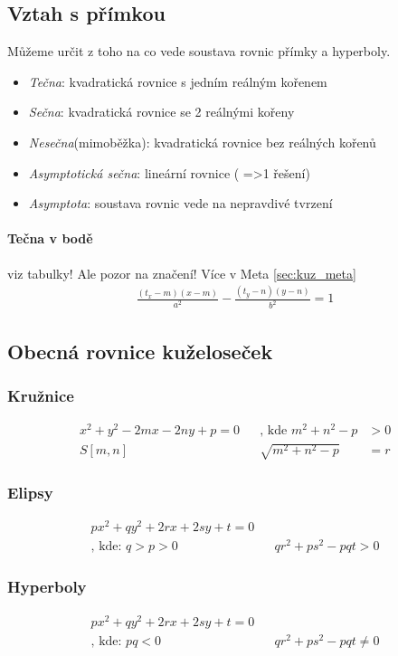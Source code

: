 \documentclass[12pt]{article}
\begin{document}
\subsection{Vztah s přímkou}
Můžeme určit z toho na co vede soustava rovnic přímky a hyperboly.
\begin{itemize}
\item \emph{Tečna}: kvadratická rovnice s jedním reálným kořenem
\item \emph{Sečna}: kvadratická rovnice se 2 reálnými kořeny
\item \emph{Nesečna}(mimoběžka): kvadratická rovnice bez reálných kořenů
\item \emph{Asymptotická sečna}: lineární rovnice ( =>1 řešení)
\item \emph{Asymptota}: soustava rovnic vede na nepravdivé tvrzení
\end{itemize}
\paragraph{Tečna v bodě}
viz tabulky! Ale pozor na značení! Více v Meta \ref{sec:kuz_meta}
\begin{align}
\frac{(t_x-m)(x-m)}{a^2} - \frac{(t_y - n)(y-n)}{b^2} = 1
\end{align}

\subsection{Obecná rovnice kuželoseček}
\subsubsection{Kružnice}
\begin{align}
x^2 + y^2 - 2mx - 2ny + p = 0 && \text{, kde	} m^2 + n^2 - p &>0 \\
S[m,n] && \sqrt{m^2 + n^2 -p} &= r
\end{align}
\subsubsection{Elipsy}
\begin{align}
px^2 + qy^2 +2rx+2sy +t =0  && \\
\text{, kde:	} q > p>0 && qr^2 + ps^2 -pqt >0
\end{align}
\subsubsection{Hyperboly}
\begin{align}
px^2 + qy^2 +2rx+2sy +t =0 \\
\text{, kde:	} pq <0 && qr^2 + ps^2 -pqt  \neq 0
\end{align}
\end{document}

